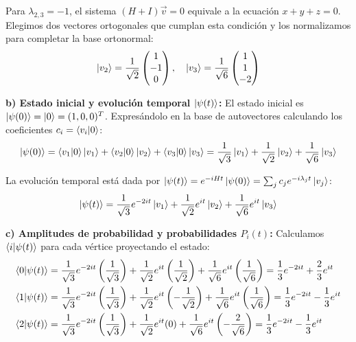 Para $\lambda_{2,3} = -1$, el sistema $(H + I)\vec{v} = 0$ equivale a la ecuación $x+y+z=0$. Elegimos dos vectores ortogonales que cumplan esta condición y los normalizamos para completar la base ortonormal:
\begin{equation*}
\ket{v_2} = \frac{1}{\sqrt{2}}\begin{pmatrix} 1 \\ -1 \\ 0 \end{pmatrix}, \quad
\ket{v_3} = \frac{1}{\sqrt{6}}\begin{pmatrix} 1 \\ 1 \\ -2 \end{pmatrix}
\end{equation*}

\vspace{0.5cm}
\textbf{b) Estado inicial y evolución temporal $\ket{\psi(t)}$:}
El estado inicial es $\ket{\psi(0)} = \ket{0} = (1, 0, 0)^T$. Expresándolo en la base de autovectores calculando los coeficientes $c_i = \braket{v_i}{0}$:
\begin{equation*}
\ket{\psi(0)} = \braket{v_1}{0}\ket{v_1} + \braket{v_2}{0}\ket{v_2} + \braket{v_3}{0}\ket{v_3} = \frac{1}{\sqrt{3}}\ket{v_1} + \frac{1}{\sqrt{2}}\ket{v_2} + \frac{1}{\sqrt{6}}\ket{v_3}
\end{equation*}

La evolución temporal está dada por $\ket{\psi(t)} = e^{-iHt}\ket{\psi(0)} = \sum_j c_j e^{-i\lambda_j t} \ket{v_j}$:
\begin{equation*}
\ket{\psi(t)} = \frac{1}{\sqrt{3}}e^{-2it}\ket{v_1} + \frac{1}{\sqrt{2}}e^{it}\ket{v_2} + \frac{1}{\sqrt{6}}e^{it}\ket{v_3}
\end{equation*}

\vspace{0.5cm}
\textbf{c) Amplitudes de probabilidad y probabilidades $P_i(t)$:}
Calculamos $\bra{i}\ket{\psi(t)}$ para cada vértice proyectando el estado:
\begin{align*}
\bra{0}\ket{\psi(t)} &= \frac{1}{\sqrt{3}}e^{-2it}\left(\frac{1}{\sqrt{3}}\right) + \frac{1}{\sqrt{2}}e^{it}\left(\frac{1}{\sqrt{2}}\right) + \frac{1}{\sqrt{6}}e^{it}\left(\frac{1}{\sqrt{6}}\right) = \frac{1}{3}e^{-2it} + \frac{2}{3}e^{it} \\
\bra{1}\ket{\psi(t)} &= \frac{1}{\sqrt{3}}e^{-2it}\left(\frac{1}{\sqrt{3}}\right) + \frac{1}{\sqrt{2}}e^{it}\left(-\frac{1}{\sqrt{2}}\right) + \frac{1}{\sqrt{6}}e^{it}\left(\frac{1}{\sqrt{6}}\right) = \frac{1}{3}e^{-2it} - \frac{1}{3}e^{it} \\
\bra{2}\ket{\psi(t)} &= \frac{1}{\sqrt{3}}e^{-2it}\left(\frac{1}{\sqrt{3}}\right) + \frac{1}{\sqrt{2}}e^{it}(0) + \frac{1}{\sqrt{6}}e^{it}\left(-\frac{2}{\sqrt{6}}\right) = \frac{1}{3}e^{-2it} - \frac{1}{3}e^{it}
\end{align*}

